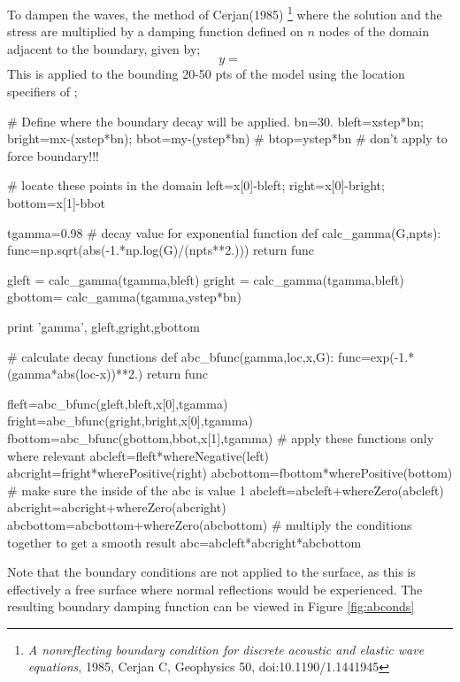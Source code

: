To dampen the waves, the method of Cerjan(1985)
\footnote{\textit{A nonreflecting boundary condition for discrete acoustic and
elastic wave equations}, 1985, Cerjan C, Geophysics 50, doi:10.1190/1.1441945}
where the solution and the stress are multiplied by a damping function defined
on $n$ nodes of the domain adjacent to the boundary, given by;
\begin{equation}
 y=
\end{equation}
This is applied to the bounding 20-50 pts of the model using the location
specifiers of \esc;
\begin{python}
# Define where the boundary decay will be applied.
bn=30.
bleft=xstep*bn; bright=mx-(xstep*bn); bbot=my-(ystep*bn)
# btop=ystep*bn # don't apply to force boundary!!!

# locate these points in the domain
left=x[0]-bleft; right=x[0]-bright; bottom=x[1]-bbot

tgamma=0.98   # decay value for exponential function
def calc_gamma(G,npts):
    func=np.sqrt(abs(-1.*np.log(G)/(npts**2.)))
    return func

gleft  = calc_gamma(tgamma,bleft)
gright = calc_gamma(tgamma,bleft)
gbottom= calc_gamma(tgamma,ystep*bn)

print 'gamma', gleft,gright,gbottom

# calculate decay functions
def abc_bfunc(gamma,loc,x,G):
    func=exp(-1.*(gamma*abs(loc-x))**2.)
    return func

fleft=abc_bfunc(gleft,bleft,x[0],tgamma)
fright=abc_bfunc(gright,bright,x[0],tgamma)
fbottom=abc_bfunc(gbottom,bbot,x[1],tgamma)
# apply these functions only where relevant
abcleft=fleft*whereNegative(left)
abcright=fright*wherePositive(right)
abcbottom=fbottom*wherePositive(bottom)
# make sure the inside of the abc is value 1
abcleft=abcleft+whereZero(abcleft)
abcright=abcright+whereZero(abcright)
abcbottom=abcbottom+whereZero(abcbottom)
# multiply the conditions together to get a smooth result
abc=abcleft*abcright*abcbottom
\end{python}
Note that the boundary conditions are not applied to the surface, as this is
effectively a free surface where normal reflections would be experienced. The
resulting boundary damping function can be viewed in Figure \ref{fig:abconds}

